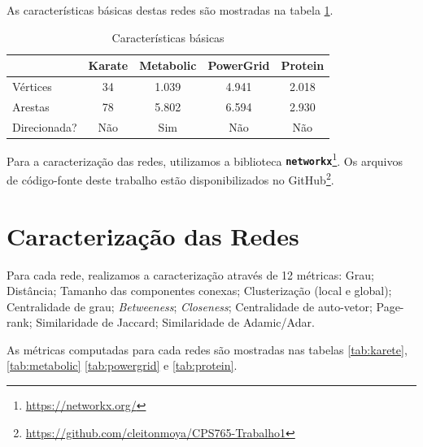 \documentclass[12pt,a4paper]{article}
\begin{document}
	As características básicas destas redes são mostradas na tabela \ref{tab:basico}.
	
	\begin{table}[hbt]
		\caption{Características básicas}
		\label{tab:basico}
		\centering
		\begin{tabular}{l|c|c|c|c}
			& \textbf{Karate} & \textbf{Metabolic} & \textbf{PowerGrid} & \textbf{Protein}   \\  \hline
			Vértices     & 34              & 1.039             & 4.941              & 2.018              \\ \hline
			Arestas      & 78              & 5.802             & 6.594              & 2.930              \\ \hline
			Direcionada? & Não             & Sim               & Não                & Não               \\ \hline
		\end{tabular}
	\end{table}

	Para a caracterização das redes, utilizamos a biblioteca \texttt{\textbf{networkx}}\footnote{\url{https://networkx.org/}}. Os arquivos de código-fonte deste trabalho estão disponibilizados no GitHub\footnote{\url{https://github.com/cleitonmoya/CPS765-Trabalho1}}.
	
	
	\section{Caracterização das Redes}
	
	Para cada rede, realizamos a caracterização através de 12 métricas: Grau; Distância; Tamanho das componentes conexas; Clusterização (local e global); Centralidade de grau; \textit{Betweeness}; \textit{Closeness}; Centralidade de auto-vetor; Page-rank; Similaridade de Jaccard; Similaridade de Adamic/Adar.
	
	As métricas computadas para cada redes são mostradas nas tabelas \ref{tab:karete}, \ref{tab:metabolic} \ref{tab:powergrid} e \ref{tab:protein}.
	
\end{document}
